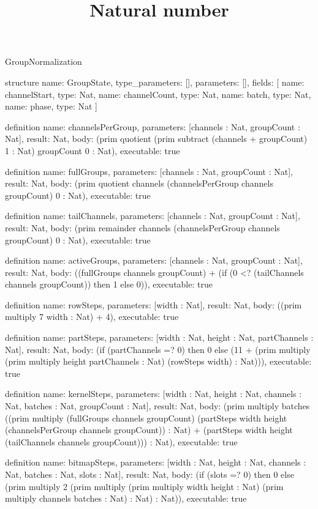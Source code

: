 \begin{lexlean}{GroupNormalization}
\title{Natural number}
\begin{semanticmodule}
structure{
  name: GroupState,
  type_parameters: [],
  parameters: [],
  fields: [
    {name: channelStart, type: Nat},
    {name: channelCount, type: Nat},
    {name: batch, type: Nat},
    {name: phase, type: Nat}
  ]
}

definition{
  name: channelsPerGroup,
  parameters: [channels : Nat, groupCount : Nat],
  result: Nat,
  body: (prim quotient (prim subtract (channels + groupCount) 1 : Nat) groupCount 0 : Nat),
  executable: true
}

definition{
  name: fullGroups,
  parameters: [channels : Nat, groupCount : Nat],
  result: Nat,
  body: (prim quotient channels (channelsPerGroup channels groupCount) 0 : Nat),
  executable: true
}

definition{
  name: tailChannels,
  parameters: [channels : Nat, groupCount : Nat],
  result: Nat,
  body: (prim remainder channels (channelsPerGroup channels groupCount) 0 : Nat),
  executable: true
}

definition{
  name: activeGroups,
  parameters: [channels : Nat, groupCount : Nat],
  result: Nat,
  body: ((fullGroups channels groupCount) + (if (0 <? (tailChannels channels groupCount)) then 1 else 0)),
  executable: true
}

definition{
  name: rowSteps,
  parameters: [width : Nat],
  result: Nat,
  body: ((prim multiply 7 width : Nat) + 4),
  executable: true
}

definition{
  name: partSteps,
  parameters: [width : Nat, height : Nat, partChannels : Nat],
  result: Nat,
  body: (if (partChannels =? 0) then 0 else (11 + (prim multiply (prim multiply height partChannels : Nat) (rowSteps width) : Nat))),
  executable: true
}

definition{
  name: kernelSteps,
  parameters: [width : Nat, height : Nat, channels : Nat, batches : Nat, groupCount : Nat],
  result: Nat,
  body: (prim multiply batches ((prim multiply (fullGroups channels groupCount) (partSteps width height (channelsPerGroup channels groupCount)) : Nat) + (partSteps width height (tailChannels channels groupCount))) : Nat),
  executable: true
}

definition{
  name: bitmapSteps,
  parameters: [width : Nat, height : Nat, channels : Nat, batches : Nat, slots : Nat],
  result: Nat,
  body: (if (slots =? 0) then 0 else (prim multiply 2 (prim multiply (prim multiply width height : Nat) (prim multiply channels batches : Nat) : Nat) : Nat)),
  executable: true
}


\end{semanticmodule}
\end{lexlean}
